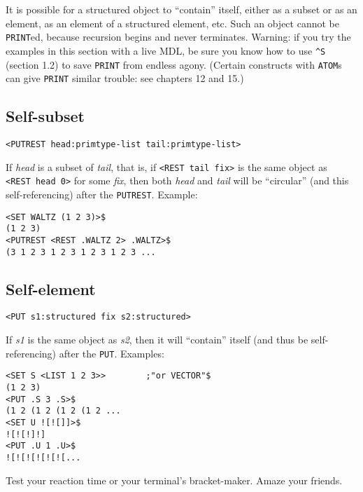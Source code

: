 \documentclass[a4paper]{scrbook}
\begin{document}
It is possible for a structured object to ``contain'' itself, either as a subset or as an element, as an element of a
structured element, etc. Such an object cannot be \texttt{PRINT}ed, because recursion begins and never terminates. Warning:
if you try the examples in this section with a live MDL, be sure you know how to use \texttt{\^{}S} (section 1.2) to save
\texttt{PRINT} from endless agony. (Certain constructs with \texttt{ATOM}s can give \texttt{PRINT} similar trouble: see
chapters 12 and 15.)

\subsection{Self-subset}\label{self-subset}

\begin{verbatim}
<PUTREST head:primtype-list tail:primtype-list>
\end{verbatim}

 If \emph{head} is a subset of \emph{tail}, that is, if
\texttt{\textless{}REST\ tail\ fix\textgreater{}} is the same object as \texttt{\textless{}REST\ head\ 0\textgreater{}} for
some \emph{fix}, then both \emph{head} and \emph{tail} will be ``circular'' (and this self-referencing) after the
\texttt{PUTREST}. Example:

\begin{verbatim}
<SET WALTZ (1 2 3)>$
(1 2 3)
<PUTREST <REST .WALTZ 2> .WALTZ>$
(3 1 2 3 1 2 3 1 2 3 1 2 3 ...
\end{verbatim}

\subsection{Self-element}\label{self-element}

\begin{verbatim}
<PUT s1:structured fix s2:structured>
\end{verbatim}

If \emph{s1} is the same object as \emph{s2}, then it will ``contain'' itself (and thus be self-referencing) after the
\texttt{PUT}. Examples:

\begin{verbatim}
<SET S <LIST 1 2 3>>        ;"or VECTOR"$
(1 2 3)
<PUT .S 3 .S>$
(1 2 (1 2 (1 2 (1 2 ...
<SET U ![![]]>$
![![!]!]
<PUT .U 1 .U>$
![![![![![![...
\end{verbatim}

Test your reaction time or your terminal's bracket-maker. Amaze your friends.
\end{document}

